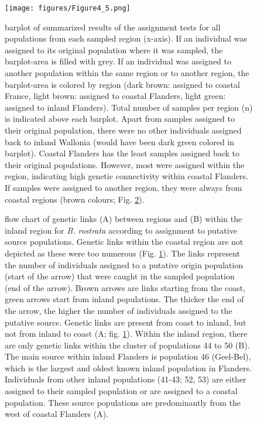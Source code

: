 \documentclass[10pt, twoside]{book} %
\begin{document}
	\begin{figure}[h!]
		\begin{center}
			\texttt{[image: figures/Figure4\_5.png]}
		\end{center}
		\begin{footnotesize}
			\caption{barplot of summarized results of the assignment tests for all populations from each sampled region (x-axis). If an individual was assigned to its original population where it was sampled, the barplot-area is filled with grey. If an individual was assigned to another population within the same region or to another region, the barplot-area is colored by region (dark brown: assigned to coastal France, light brown: assigned to coastal Flanders, light green: assigned to inland Flanders). Total number of samples per region (n) is indicated above each barplot. Apart from samples assigned to their original population, there were no other individuals assigned back to inland Wallonia (would have been dark green colored in barplot). Coastal Flanders has the least samples assigned back to their original populations. However, most were assigned within the region, indicating high genetic connectivity within coastal Flanders. If samples were assigned to another region, they were always from coastal regions (brown colours; Fig. \ref{fig4.6}). \label{fig4.5}}
		\end{footnotesize}
	\end{figure}

	\clearpage
	\thispagestyle{empty}
	\begin{figure}[h!]
		\vspace*{-1cm}
		\begin{footnotesize}
			\vspace*{-4mm}
			\caption{flow chart of genetic links (A) between regions and (B) within the inland region for \textit{B. rostrata} according to assignment to putative source populations. Genetic links within the coastal region are not depicted as these were too numerous (Fig. \ref{fig4.5}). The links represent the number of individuals assigned to a putative origin population (start of the arrow) that were caught in the sampled population (end of the arrow). Brown arrows are links starting from the coast, green arrows start from inland populations. The thicker the end of the arrow, the higher the number of individuals assigned to the putative source. Genetic links are present from coast to inland, but not from inland to coast (A; fig. \ref{fig4.5}). Within the inland region, there are only genetic links within the cluster of populations 44 to 50 (B). The main source within inland Flanders is population 46 (Geel-Bel), which is the largest and oldest known inland population in Flanders. Individuals from other inland populations (41-43; 52, 53) are either assigned to their sampled population or are assigned to a coastal population. These source populations are predominantly from the west of coastal Flanders (A).  \label{fig4.6}}
		\end{footnotesize}
	\end{figure}
	\clearpage
	
\end{document}
